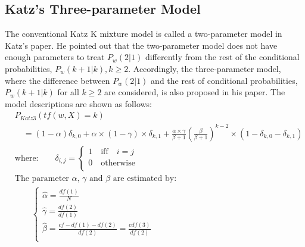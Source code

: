 \documentclass[english]{jnlp_1.4_rep}
\begin{document}
\subsection{Katz's Three-parameter Model}

The conventional Katz K mixture model is called a two-parameter model in Katz's paper. He pointed out that the two-parameter model does not have
enough parameters to treat $P_{w}(2|1)$ differently from the rest of the conditional probabilities, $P_{w}(k+1|k),k\ge 2$. Accordingly, the
three-parameter model, where the difference between $P_{w}(2|1)$ and the rest of conditional probabilities, $P_{w}(k+1 \vert k)$ for all $k \geq 2$
are considered, is also proposed in his paper. The model descriptions are shown as follows:
{\allowdisplaybreaks
\begin{align*}
 & P_{\mathit{Katz3}}(\mathit{tf}(w,X)=k) \\
 & \quad = (1 - \alpha)\delta_{k,0} + \alpha \times(1-\gamma)\times \delta _{k,1} + \frac{\alpha \times
	\gamma }{\beta + 1}\left(\frac{\beta}{\beta + 1}\right)^{k -2}\times(1-\delta_{k,0}-\delta _{k,1}) \\
 & \mbox{where:} \qquad
	 \delta _{i,j}= \left\{
            \begin{array}{l}
             1 \quad \mbox{iff} \quad i = j \\
             0 \quad \mbox{otherwise} \\
            \end{array} \right.\\
 & \mbox{The parameter $\alpha$, $\gamma$ and $\beta$ are estimated by:} \\
 & \qquad \left\{\begin{array}{l}
		\hat{\alpha} = \frac{\mathit{df}(1)}{N} \\
		\hat{\gamma}  = \frac{\mathit{df}(2)}{\mathit{df}(1)} \\
		\hat{\beta}  = \frac{\mathit{cf}-\mathit{df}(1)-\mathit{df}(2)}{\mathit{df}(2)} = \frac{\mathit{cdf}(3)}{\mathit{df}(2)} \\
	  \end{array}\right.
\end{align*}
}
\end{document}
